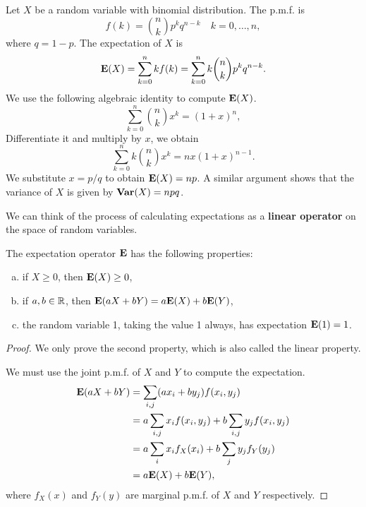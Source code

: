 \begin{example}
Let $X$ be a random variable with binomial distribution. The p.m.f. is 
\begin{equation*}
    f(k) = \binom{n}{k} p^k q^{n-k} \quad k = 0,\dots, n,
\end{equation*}
where $q = 1-p$. The expectation of $X$ is
\begin{equation*}
    \mathbf{E}(X) = \sum_{k=0}^n k f(k) = \sum_{k=0}^n k\binom{n}{k} p^k q^{n-k}.
\end{equation*}
We use the following algebraic identity to compute $\mathbf{E}(X)$.
\begin{equation}
    \label{eq:4.2}
    \tag{4-2}
    \sum_{k=0}^n \binom{n}{k} x^k = (1+x)^n, 
\end{equation}
Differentiate it and multiply by $x$, we obtain 
\begin{equation}
    \label{eq:4.3}
    \tag{4-3}
    \sum_{k=0}^n k \binom{n}{k} x^k = nx(1+x)^{n-1}. 
\end{equation}
We substitute $x = p / q$ to obtain $\mathbf{E}(X) = np$. A similar argument shows that the variance of $X$ is given by $\mathbf{Var}(X) = npq$. 
\end{example}

We can think of the process of calculating expectations as a \textbf{linear operator} on the space of random variables. 

\begin{theorem}
The expectation operator $\mathbf{E}$ has the following properties: 
\begin{enumerate}[(a)]
    \item if $X\geq 0$, then $\mathbf{E}(X) \geq 0$,
    \item if $a, b \in \mathbb{R}$, then $\mathbf{E}(aX+bY) = a\mathbf{E}(X) + b\mathbf{E}(Y)$,
    \item the random variable 1, taking the value 1 always, has expectation $\mathbf{E}(1) = 1$. 
\end{enumerate}
\end{theorem}

\begin{proof}
We only prove the second property, which is also called the linear property.

We must use the joint p.m.f. of $X$ and $Y$ to compute the expectation. 
\begin{equation*}
    \begin{split}
        \mathbf{E}(aX+bY) &= \sum_{i, j} (ax_i + by_j) f(x_i, y_j) \\
        &= a \sum_{i,j} x_i f(x_i, y_j) + b\sum_{i,j} y_j f(x_i, y_j) \\
        &= a\sum_{i} x_i f_X(x_i) + b\sum_{j}y_j f_Y(y_j) \\ 
        &= a\mathbf{E}(X) + b\mathbf{E}(Y),
    \end{split}
\end{equation*}
where $f_X(x)$ and $f_Y(y)$ are marginal p.m.f. of $X$ and $Y$ respectively.
\end{proof}

